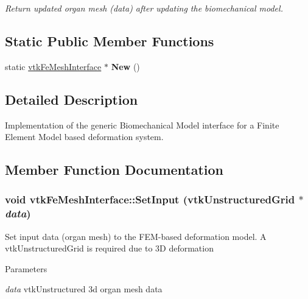\begin{DoxyCompactItemize}
\begin{DoxyCompactList}\small\item\em Return updated organ mesh (data) after updating the biomechanical model. \item\end{DoxyCompactList}\end{DoxyCompactItemize}
\subsection*{Static Public Member Functions}
\begin{DoxyCompactItemize}
\item 
\hypertarget{classvtkFeMeshInterface_a25b7c0b6398c8401bdf0a05cd1c047cb}{
static \hyperlink{classvtkFeMeshInterface}{vtkFeMeshInterface} $\ast$ {\bfseries New} ()}
\label{classvtkFeMeshInterface_a25b7c0b6398c8401bdf0a05cd1c047cb}

\end{DoxyCompactItemize}


\subsection{Detailed Description}
Implementation of the generic Biomechanical Model interface for a Finite Element Model based deformation system. 

\subsection{Member Function Documentation}
\hypertarget{classvtkFeMeshInterface_ad3b9e23968d1f8b8519cedcfd781ee26}{
\subsubsection[{SetInput}]{\setlength{\rightskip}{0pt plus 5cm}void vtkFeMeshInterface::SetInput (vtkUnstructuredGrid $\ast$ {\em data})}}
\label{classvtkFeMeshInterface_ad3b9e23968d1f8b8519cedcfd781ee26}


Set input data (organ mesh) to the FEM-\/based deformation model. A vtkUnstructuredGrid is required due to 3D deformation 
\begin{DoxyParams}{Parameters}
\item[{\em data}]vtkUnstructured 3d organ mesh data \end{DoxyParams}


